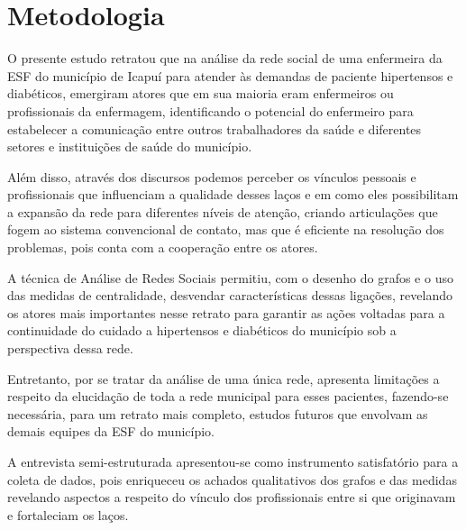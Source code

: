 \chapter{Metodologia}
\label{chap:metodologia}

O presente estudo retratou que na análise da rede social de uma enfermeira da ESF do município de Icapuí para atender às demandas de paciente hipertensos e diabéticos, emergiram atores que em sua maioria eram enfermeiros ou profissionais da enfermagem, identificando o potencial do enfermeiro para estabelecer a comunicação entre outros trabalhadores da saúde e diferentes setores e instituições de saúde do município. 

Além disso, através dos discursos podemos perceber os vínculos pessoais e profissionais que influenciam a qualidade desses laços e em como eles possibilitam a expansão da rede para diferentes níveis de atenção, criando articulações que fogem ao sistema convencional de contato, mas que é eficiente na resolução dos problemas, pois conta com a cooperação entre os atores.

A técnica de Análise de Redes Sociais permitiu, com o desenho do grafos e o uso das medidas de centralidade, desvendar características dessas ligações, revelando os atores mais importantes nesse retrato para garantir as ações voltadas para a continuidade do cuidado a hipertensos e diabéticos do município sob a perspectiva dessa rede. 

Entretanto, por se tratar da análise de uma única rede, apresenta limitações a respeito da elucidação de toda a rede municipal para esses pacientes, fazendo-se necessária, para um retrato mais completo, estudos futuros que envolvam as demais equipes da ESF do município. 

A entrevista semi-estruturada apresentou-se como instrumento satisfatório para a coleta de dados, pois enriqueceu os achados qualitativos dos grafos e das medidas revelando aspectos a respeito do vínculo dos profissionais entre si que originavam e fortaleciam os laços. 
